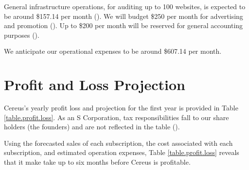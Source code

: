 General infrastructure operations, for auditing up to 100 websites, is expected to be around \$157.14 per month (). We will budget \$250 per month for advertising and promotion (). Up to \$200 per month will be reserved for general accounting purposes ().

We anticipate our operational expenses to be around \$607.14 per month.

\section{Profit and Loss Projection}

Cereus's yearly profit loss and projection for the first year is provided in Table \ref{table.profit.loss}. As an S Corporation, tax responsibilities fall to our share holders (the founders) and are not reflected in the table ().

Using the forecasted sales of each subscription, the cost associated with each subscription, and estimated operation expenses, Table \ref{table.profit.loss} reveals that it make take up to six months before Cereus is profitable.

